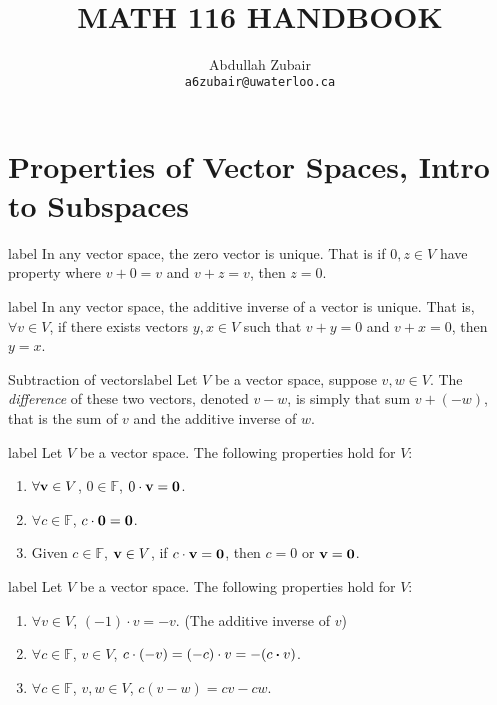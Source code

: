 \documentclass[12pt]{article}
\title{ \normalsize \textsc{}   %
      \\[2.0cm]               %
      \HRule{0.5pt} \\            %
      \LARGE \textbf{\uppercase{Math 116 Handbook}} %
      \HRule{2pt} \\ [0.5cm]    %
      \normalsize     %
    }
\author{
    Abdullah Zubair\\
        \texttt{a6zubair@uwaterloo.ca} \\
}
\theoremstyle{definition}
\newcommand{\F}{\ensuremath{\mathbb{F}}}
\begin{document}
\setcounter{section}{1}
\section{Properties of Vector Spaces, Intro to Subspaces}
\begin{theorem}{}{label}
    In any vector space, the zero vector is unique. That is if $0,z \in V$ have property where $v + 0 = v$ and $v + z = v$, then $z = 0$.
\end{theorem}
\begin{theorem}{}{label}
    In any vector space, the additive inverse of a vector is unique. That is, $\forall v\in V$, if there exists vectors $y,x\in V$ such that $v + y = 0$ and $v + x = 0$, then $y = x$.
\end{theorem}
\begin{definition}{Subtraction of vectors}{label}
   Let $V$ be a vector space, suppose $v,w\in V$. The \emph{difference} of these two vectors, denoted $v - w$, is simply that sum $v + (-w)$, that is the sum of $v$ and the additive inverse of $w$.
\end{definition}
\begin{lemma}{}{label}
   Let $V$ be a vector space. The following properties hold for $V$:
   \begin{enumerate}
       \item $\forall \vb v\in V$, $0\in \F$, $0\cdot \vb v = \vb 0$. 
       \item $\forall c\in \F$, $c \cdot \vb 0 = \vb 0$.
       \item Given $c\in \F$, $\vb v\in V$, if $c\cdot \vb v = \vb 0$, then $c = 0$ or $\vb v = \vb 0$.
   \end{enumerate}
\end{lemma}
\begin{lemma}{}{label}
   Let $V$ be a vector space. The following properties hold for $V$:
   \begin{enumerate}
       \item $\forall v\in V$, $(-1)\cdot v = -v$. (The additive inverse of $v$)
       \item $\forall c\in \F$, $v\in V$, $c\cdot (-v) = (-c) \cdot v = -(c\vdot v)$.
       \item $\forall c\in \F$, $v,w\in V$, $c(v - w) = cv - cw$.
   \end{enumerate}
\end{lemma}
\end{document}
